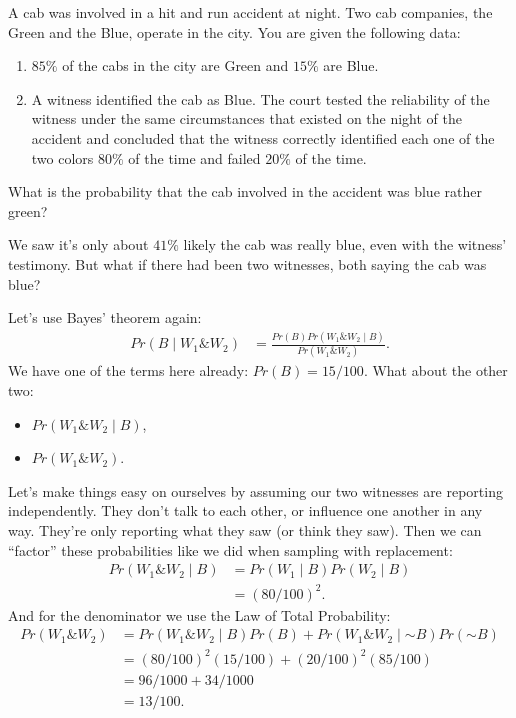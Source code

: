 \documentclass[justified]{tufte-book}
\providecommand{\tightlist}{%
  \setlength{\itemsep}{0pt}\setlength{\parskip}{0pt}}
\newcommand{\given}{\mid}
\renewcommand{\neg}{\mathbin{\sim}}
\renewcommand{\wedge}{\mathbin{\&}}
\newcommand{\p}{Pr}
\theoremstyle{definition}
\theoremstyle{definition}
\theoremstyle{definition}
\theoremstyle{remark}
\let\BeginKnitrBlock\begin \let\EndKnitrBlock\end
\begin{document}
\BeginKnitrBlock{problem}
A cab was involved in a hit and run accident at night. Two cab
companies, the Green and the Blue, operate in the city. You are given
the following data:

\begin{enumerate}
\def\labelenumi{\arabic{enumi}.}
\tightlist
\item
  \(85\%\) of the cabs in the city are Green and \(15\%\) are Blue.
\item
  A witness identified the cab as Blue. The court tested the reliability
  of the witness under the same circumstances that existed on the night
  of the accident and concluded that the witness correctly identified
  each one of the two colors \(80\%\) of the time and failed \(20\%\) of
  the time.
\end{enumerate}

What is the probability that the cab involved in the accident was blue
rather green?
\EndKnitrBlock{problem}

We saw it's only about \(41\%\) likely the cab was really blue, even
with the witness' testimony. But what if there had been two witnesses,
both saying the cab was blue?

Let's use Bayes' theorem again: \[
  \begin{aligned}
    \p(B \given W_1 \wedge W_2) &= \frac{\p(B)\p(W_1 \wedge W_2 \given B)}{\p(W_1 \wedge W_2)}.
  \end{aligned}
\] We have one of the terms here already: \(\p(B) = 15/100\). What about
the other two:

\begin{itemize}
\tightlist
\item
  \(\p(W_1 \wedge W_2 \given B)\),
\item
  \(\p(W_1 \wedge W_2)\).
\end{itemize}

Let's make things easy on ourselves by assuming our two witnesses are
reporting independently. They don't talk to each other, or influence one
another in any way. They're only reporting what they saw (or think they
saw). Then we can ``factor'' these probabilities like we did when
sampling with replacement: \[
  \begin{aligned}
    \p(W_1 \wedge W_2 \given B) &= \p(W_1 \given B) \p(W_2 \given B)\\
                                &= (80/100)^2.
  \end{aligned}
\] And for the denominator we use the Law of Total Probability: \[
  \begin{aligned}
    \p(W_1 \wedge W_2) &= \p(W_1 \wedge W_2 \given B)\p(B) + 
                          \p(W_1 \wedge W_2 \given \neg B)\p(\neg B)\\
                       &= (80/100)^2(15/100) + (20/100)^2(85/100)\\
                       &= 96/1000 + 34/1000\\
                       &= 13/100.
  \end{aligned}
\]
\end{document}

